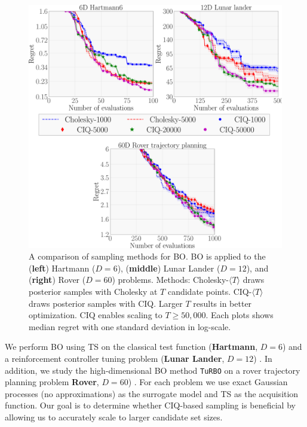 \begin{figure}[t!]
  \centering
  \includegraphics[width=0.85\linewidth]{figures/bo_ciq.pdf}
  \caption[
    A comparison of sampling methods for Bayesian optimization (BO) via TS and \texttt{TuRBO}.
    TS is applied to the Hartmann ($D=6$) and Lunar Lander ($D=12$) while \texttt{TuRBO} is used for Rover ($D=60$).
  ]{
    A comparison of sampling methods for BO.
    BO is applied to the ({\bf left}) Hartmann ($D=6$), ({\bf middle}) Lunar Lander ($D=12$), and ({\bf right}) Rover ($D=60$) problems.
    Methods: Cholesky-$\langle T \rangle$ draws posterior samples with Cholesky at $T$ candidate points.
    CIQ-$\langle T \rangle$ draws posterior samples with CIQ.
    Larger $T$ results in better optimization.
    CIQ enables scaling to $T\geq50,\!000$.
    Each plots shows median regret with one standard deviation in log-scale.
  }
  \label{fig:bayesopt}
\end{figure}

We perform BO using TS on the classical test function ({\bf Hartmann}, $D=6$) and a reinforcement controller tuning problem ({\bf Lunar Lander}, $D=12$) \cite{eriksson2019scalable}.
In addition, we study the high-dimensional BO method \texttt{TuRBO} \cite{eriksson2019scalable} on a rover trajectory planning problem {\bf Rover}, $D=60$) \cite{wang2017batched}.
For each problem we use exact Gaussian processes (no approximations) as the surrogate model and TS as the acquisition function.
Our goal is to determine whether CIQ-based sampling is beneficial by allowing us to accurately scale to larger candidate set sizes.

